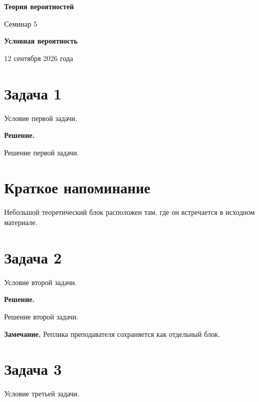 \documentclass[a4paper,12pt]{article}
\begin{document}
\begin{center}
    {\Large\bfseries Теория вероятностей}

    \vspace{0.3em}

    {\large Семинар 5}

    \vspace{0.3em}

    \textbf{Условная вероятность}

    \vspace{0.3em}

    {\small 12 сентября 2026 года}
\end{center}

\vspace{1em}

\section*{Задача 1}

Условие первой задачи.

\textbf{Решение.}

Решение первой задачи.

\section*{Краткое напоминание}

Небольшой теоретический блок расположен там, где он встречается в исходном
материале.

\section*{Задача 2}

Условие второй задачи.

\textbf{Решение.}

Решение второй задачи.

\medskip

\noindent\textbf{Замечание.}
Реплика преподавателя сохраняется как отдельный блок.

\section*{Задача 3}

Условие третьей задачи.

\end{document}

